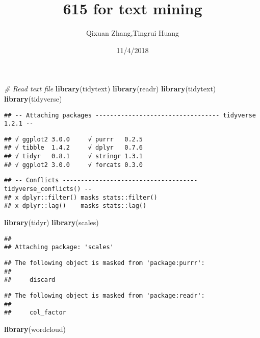 \documentclass[]{article}
\title{615 for text mining}
\author{Qixuan Zhang,Tingrui Huang}
\date{11/4/2018}
\newenvironment{Shaded}{\begin{snugshade}}{\end{snugshade}}
\newcommand{\KeywordTok}[1]{\textcolor[rgb]{0.13,0.29,0.53}{\textbf{{#1}}}}
\newcommand{\CommentTok}[1]{\textcolor[rgb]{0.56,0.35,0.01}{\textit{{#1}}}}
\newcommand{\NormalTok}[1]{{#1}}
\begin{document}
\maketitle

\begin{Shaded}
\begin{Highlighting}[]
\CommentTok{# Read text file}
\KeywordTok{library}\NormalTok{(tidytext)}
\KeywordTok{library}\NormalTok{(readr)}
\KeywordTok{library}\NormalTok{(tidytext)}
\KeywordTok{library}\NormalTok{(tidyverse)}
\end{Highlighting}
\end{Shaded}

\begin{verbatim}
## -- Attaching packages ---------------------------------- tidyverse 1.2.1 --
\end{verbatim}

\begin{verbatim}
## √ ggplot2 3.0.0     √ purrr   0.2.5
## √ tibble  1.4.2     √ dplyr   0.7.6
## √ tidyr   0.8.1     √ stringr 1.3.1
## √ ggplot2 3.0.0     √ forcats 0.3.0
\end{verbatim}

\begin{verbatim}
## -- Conflicts ------------------------------------- tidyverse_conflicts() --
## x dplyr::filter() masks stats::filter()
## x dplyr::lag()    masks stats::lag()
\end{verbatim}

\begin{Shaded}
\begin{Highlighting}[]
\KeywordTok{library}\NormalTok{(tidyr)}
\KeywordTok{library}\NormalTok{(scales)}
\end{Highlighting}
\end{Shaded}

\begin{verbatim}
## 
## Attaching package: 'scales'
\end{verbatim}

\begin{verbatim}
## The following object is masked from 'package:purrr':
## 
##     discard
\end{verbatim}

\begin{verbatim}
## The following object is masked from 'package:readr':
## 
##     col_factor
\end{verbatim}

\begin{Shaded}
\begin{Highlighting}[]
\KeywordTok{library}\NormalTok{(wordcloud)}
\end{Highlighting}
\end{Shaded}
\end{document}
